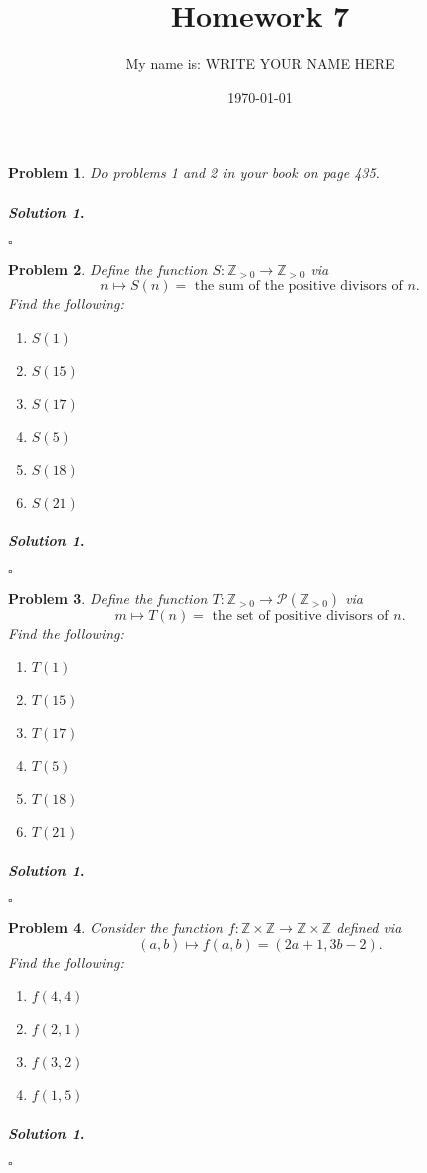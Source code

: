 \documentclass{amsart}
\theoremstyle{plain}
\newtheorem{problem}{Problem}
\newenvironment{solution}{\paragraph{\emph{Solution 1}.}}{\hfill$\square$}
\begin{document}
 

\title[Homework 7]{Homework 7}
\author{My name is:  WRITE YOUR NAME HERE}  %
\date{\today} 
\maketitle 

\begin{problem}
Do problems 1 and 2 in your book on page 435.
\end{problem}
\begin{solution}
\end{solution}

\begin{problem}
Define the function $S:\mathbb{Z}_{>0} \rightarrow \mathbb{Z}_{>0}$ via 
$$n \mapsto S(n) = \text{ the sum of the positive divisors of } n.$$
Find the following:
\begin{enumerate}
\item $S(1)$
\item $S(15)$
\item $S(17)$
\item $S(5)$
\item $S(18)$
\item $S(21)$
\end{enumerate}
\end{problem}
\begin{solution}
\end{solution}

\begin{problem}
Define the function $T:\mathbb{Z}_{>0} \rightarrow \mathcal{P}(\mathbb{Z}_{>0})$ via
$$m \mapsto T(n) = \text{ the set of positive divisors of }n. $$
Find the following:
\begin{enumerate}
\item $T(1)$
\item $T(15)$
\item $T(17)$
\item $T(5)$
\item $T(18)$
\item $T(21)$
\end{enumerate}
\end{problem}
\begin{solution}
\end{solution}


\begin{problem}
Consider the function $f:\mathbb{Z} \times \mathbb{Z} \rightarrow \mathbb{Z} \times \mathbb{Z}$ defined via
$$(a,b) \mapsto f(a,b) = (2a+1,3b-2). $$
Find the following:
\begin{enumerate}
\item $f(4,4)$
\item $f(2,1)$
\item $f(3,2)$
\item $f(1,5)$
\end{enumerate}
\end{problem}
\begin{solution}
\end{solution}
\end{document}
